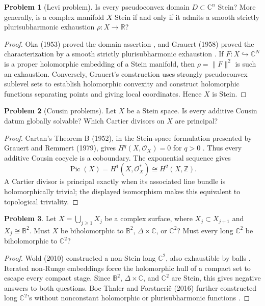 \documentclass[11pt,reqno]{amsart}
\theoremstyle{definition}
\newtheorem{problem}{Problem}[section]
\theoremstyle{remark}
\begin{document}
\begin{problem}[Levi problem]\label{Z-Levi}
Is every pseudoconvex domain $D\subset\mathbb C^n$ Stein? More generally, is a complex manifold $X$ Stein if and only if it admits a smooth strictly plurisubharmonic exhaustion $\rho:X\to\mathbb R$?
\end{problem}
\begin{proof}
Oka (1953) proved the domain assertion \cite{SM-Oka53}, and Grauert (1958) proved the characterization by a smooth strictly plurisubharmonic exhaustion \cite{Z-Grauert}. If $F:X\hookrightarrow\mathbb C^N$ is a proper holomorphic embedding of a Stein manifold, then $\rho=\|F\|^2$ is such an exhaustion. Conversely, Grauert's construction uses strongly pseudoconvex sublevel sets to establish holomorphic convexity and construct holomorphic functions separating points and giving local coordinates. Hence $X$ is Stein.
\end{proof}

\begin{problem}[Cousin problems]\label{Z-Cousin}
Let $X$ be a Stein space. Is every additive Cousin datum globally solvable? Which Cartier divisors on $X$ are principal?
\end{problem}
\begin{proof}
Cartan's Theorem B (1952), in the Stein-space formulation presented by Grauert and Remmert (1979), gives $H^q(X,\mathcal O_X)=0$ for $q>0$ \cite{SM-Cartan52,Z-GR}. Thus every additive Cousin cocycle is a coboundary. The exponential sequence gives
\[
 \operatorname{Pic}(X)=H^1(X,\mathcal O_X^*)\cong H^2(X,\mathbb Z).
\]
A Cartier divisor is principal exactly when its associated line bundle is holomorphically trivial; the displayed isomorphism makes this equivalent to topological triviality.
\end{proof}

\begin{problem}\label{b95-4-3-2}\label{FS-2.6}
Let $X=\bigcup_{j\geq1}X_j$ be a complex surface, where $X_j\subset X_{j+1}$ and $X_j\cong\mathbb B^2$. Must $X$ be biholomorphic to $\mathbb B^2$, $\Delta\times\mathbb C$, or $\mathbb C^2$? Must every long $\mathbb C^2$ be biholomorphic to $\mathbb C^2$?
\end{problem}
\begin{proof}
Wold (2010) constructed a non-Stein long $\mathbb C^2$, also exhaustible by balls \cite{B95-Wold10}. Iterated non-Runge embeddings force the holomorphic hull of a compact set to escape every compact stage. Since $\mathbb B^2$, $\Delta\times\mathbb C$, and $\mathbb C^2$ are Stein, this gives negative answers to both questions. Boc Thaler and Forstneri\v c (2016) further constructed long $\mathbb C^2$'s without nonconstant holomorphic or plurisubharmonic functions \cite{FS-BTF}.
\end{proof}
\end{document}
